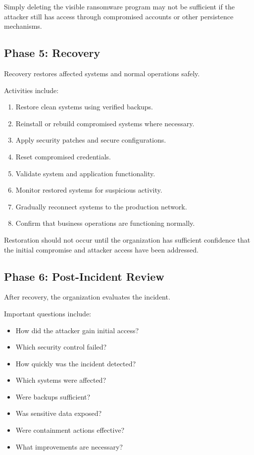 Simply deleting the visible ransomware program may not be sufficient if the attacker still has access through compromised accounts or other persistence mechanisms.

\subsection{Phase 5: Recovery}

Recovery restores affected systems and normal operations safely.

Activities include:

\begin{enumerate}
\item Restore clean systems using verified backups.
\item Reinstall or rebuild compromised systems where necessary.
\item Apply security patches and secure configurations.
\item Reset compromised credentials.
\item Validate system and application functionality.
\item Monitor restored systems for suspicious activity.
\item Gradually reconnect systems to the production network.
\item Confirm that business operations are functioning normally.
\end{enumerate}

Restoration should not occur until the organization has sufficient confidence that the initial compromise and attacker access have been addressed.

\subsection{Phase 6: Post-Incident Review}

After recovery, the organization evaluates the incident.

Important questions include:

\begin{itemize}
\item How did the attacker gain initial access?
\item Which security control failed?
\item How quickly was the incident detected?
\item Which systems were affected?
\item Were backups sufficient?
\item Was sensitive data exposed?
\item Were containment actions effective?
\item What improvements are necessary?
\end{itemize}

